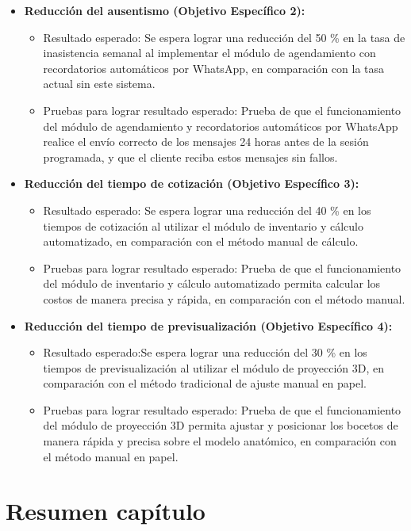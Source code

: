 \begin{itemize}
  \item \textbf{Reducción del ausentismo (Objetivo Específico 2):}
  \begin{itemize}
    \item Resultado esperado: Se espera lograr una reducción del 50 \% en la tasa de inasistencia semanal al implementar el módulo de agendamiento con recordatorios automáticos por WhatsApp, en comparación con la tasa actual sin este sistema.
    \item Pruebas para lograr resultado esperado: Prueba de que el funcionamiento del módulo de agendamiento y recordatorios automáticos por WhatsApp realice el envío correcto de los mensajes 24 horas antes de la sesión programada, y que el cliente reciba estos mensajes sin fallos.
  \end{itemize}
  \item \textbf{Reducción del tiempo de cotización (Objetivo Específico 3):}
  \begin{itemize}
    \item Resultado esperado: Se espera lograr una reducción del 40 \% en los tiempos de cotización al utilizar el módulo de inventario y cálculo automatizado, en comparación con el método manual de cálculo.
    \item Pruebas para lograr resultado esperado: Prueba de que el funcionamiento del módulo de inventario y cálculo automatizado permita calcular los costos de manera precisa y rápida, en comparación con el método manual.
  \end{itemize}
  \item \textbf{Reducción del tiempo de previsualización (Objetivo Específico 4):}
  \begin{itemize}
    \item Resultado esperado:Se espera lograr una reducción del 30 \% en los tiempos de previsualización al utilizar el módulo de proyección 3D, en comparación con el método tradicional de ajuste manual en papel.
    \item Pruebas para lograr resultado esperado: Prueba de que el funcionamiento del módulo de proyección 3D permita ajustar y posicionar los bocetos de manera rápida y precisa sobre el modelo anatómico, en comparación con el método manual en papel.
  \end{itemize}
\end{itemize}

\section{Resumen capítulo}


